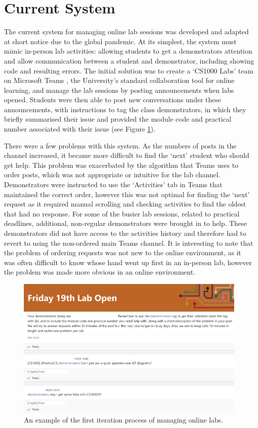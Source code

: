 \section{Current System} \label{sec:currentsystem}

The current system for managing online lab sessions was developed and adapted at short notice due to the global pandemic. At its simplest, the system must mimic in-person lab activities: allowing students to get a demonstrators attention and allow communication between a student and demonstrator, including showing code and resulting errors. The initial solution was to create a `CS1000 Labs' team on Microsoft Teams \cite{teams}, the University's standard collaboration tool for online learning, and manage the lab sessions by posting announcements when labs opened. Students were then able to post new conversations under these announcements, with instructions to tag the class demonstrators, in which they briefly summarised their issue and provided the module code and practical number associated with their issue (see Figure \ref{fig:teamsone}).

There were a few problems with this system. As the numbers of posts in the channel increased, it became more difficult to find the `next' student who should get help. This problem was exacerbated by the algorithm that Teams uses to order posts, which was not appropriate or intuitive for the lab channel. Demonstrators were instructed to use the `Activities' tab in Teams that maintained the correct order, however this was not optimal for finding the `next' request as it required manual scrolling and checking activities to find the oldest that had no response. For some of the busier lab sessions, related to practical deadlines, additional, non-regular demonstrators were brought in to help. These demonstrators did not have access to the activities history and therefore had to revert to using the non-ordered main Teams channel. It is interesting to note that the problem of ordering requests was not new to the online environment, as it was often difficult to know whose hand went up first in an in-person lab, however the problem was made more obvious in an online environment.

\FloatBarrier
\begin{figure}[H]
  \centering
  \includegraphics[width=\textwidth]{2context/images/teams1.png} 
    \caption{An example of the first iteration process of managing online labs.}
  \label{fig:teamsone}
\end{figure}

